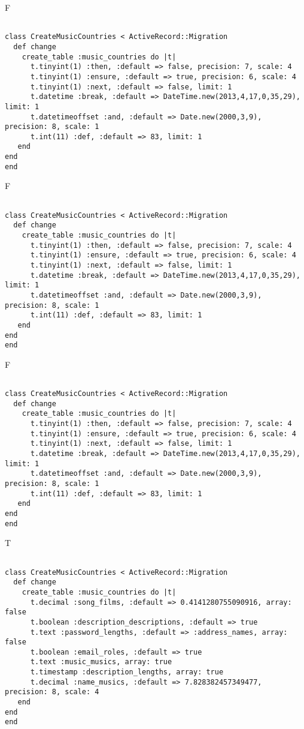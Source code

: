 F
\begin{verbatim}
		
class CreateMusicCountries < ActiveRecord::Migration 
  def change 
    create_table :music_countries do |t| 
      t.tinyint(1) :then, :default => false, precision: 7, scale: 4
      t.tinyint(1) :ensure, :default => true, precision: 6, scale: 4
      t.tinyint(1) :next, :default => false, limit: 1
      t.datetime :break, :default => DateTime.new(2013,4,17,0,35,29), limit: 1
      t.datetimeoffset :and, :default => Date.new(2000,3,9), precision: 8, scale: 1
      t.int(11) :def, :default => 83, limit: 1
   end
end
end
\end{verbatim}

F
\begin{verbatim}
		
class CreateMusicCountries < ActiveRecord::Migration 
  def change 
    create_table :music_countries do |t| 
      t.tinyint(1) :then, :default => false, precision: 7, scale: 4
      t.tinyint(1) :ensure, :default => true, precision: 6, scale: 4
      t.tinyint(1) :next, :default => false, limit: 1
      t.datetime :break, :default => DateTime.new(2013,4,17,0,35,29), limit: 1
      t.datetimeoffset :and, :default => Date.new(2000,3,9), precision: 8, scale: 1
      t.int(11) :def, :default => 83, limit: 1
   end
end
end
\end{verbatim}

F
\begin{verbatim}
		
class CreateMusicCountries < ActiveRecord::Migration 
  def change 
    create_table :music_countries do |t| 
      t.tinyint(1) :then, :default => false, precision: 7, scale: 4
      t.tinyint(1) :ensure, :default => true, precision: 6, scale: 4
      t.tinyint(1) :next, :default => false, limit: 1
      t.datetime :break, :default => DateTime.new(2013,4,17,0,35,29), limit: 1
      t.datetimeoffset :and, :default => Date.new(2000,3,9), precision: 8, scale: 1
      t.int(11) :def, :default => 83, limit: 1
   end
end
end
\end{verbatim}

T
\begin{verbatim}
		
class CreateMusicCountries < ActiveRecord::Migration 
  def change 
    create_table :music_countries do |t| 
      t.decimal :song_films, :default => 0.4141280755090916, array: false
      t.boolean :description_descriptions, :default => true
      t.text :password_lengths, :default => :address_names, array: false
      t.boolean :email_roles, :default => true
      t.text :music_musics, array: true
      t.timestamp :description_lengths, array: true
      t.decimal :name_musics, :default => 7.828382457349477, precision: 8, scale: 4
   end
end
end
\end{verbatim}

